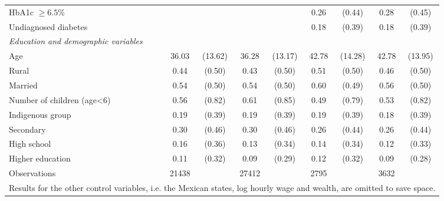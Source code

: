 \documentclass[12pt,english,british]{article}
\begin{document}
\begin{table}[!ht]
\begin{center}
\begin{adjustbox}{max width=\textwidth}
{\begin{tabular}{l*{4}{cc}}
HbA1c $\geq 6.5\%$  &            &            &            &            &        0.26&      (0.44)&        0.28&      (0.45)\\
Undiagnosed diabetes&            &            &            &            &        0.18&      (0.39)&        0.18&      (0.39)\\
\hspace*{10mm}\emph{Education and demographic variables}&&&& \\
Age                 &       36.03&     (13.62)&       36.28&     (13.17)&       42.78&     (14.28)&       42.78&     (13.95)\\
Rural&        0.44&      (0.50)&        0.43&      (0.50)&        0.51&      (0.50)&        0.46&      (0.50)\\
Married             &        0.54&      (0.50)&        0.54&      (0.50)&        0.60&      (0.49)&        0.56&      (0.50)\\
Number of children (age<6)&        0.56&      (0.82)&        0.61&      (0.85)&        0.49&      (0.79)&        0.53&      (0.82)\\
Indigenous group    &        0.19&      (0.39)&        0.19&      (0.39)&        0.19&      (0.39)&        0.18&      (0.39)\\
Secondary           &        0.30&      (0.46)&        0.30&      (0.46)&        0.26&      (0.44)&        0.26&      (0.44)\\
High school         &        0.16&      (0.36)&        0.13&      (0.34)&        0.14&      (0.34)&        0.12&      (0.33)\\
Higher education    &        0.11&      (0.32)&        0.09&      (0.29)&        0.12&      (0.32)&        0.09&      (0.28)\\
\midrule
Observations        &       21438&            &       27412&            &        2795&            &        3632&            \\
\bottomrule
\multicolumn{9}{l}{\footnotesize Results for the other control variables, i.e. the Mexican states, log hourly wage and wealth, are omitted to save space.}\\
\end{tabular}
}
\end{adjustbox}
\end{center}
\end{table}
\end{document}
